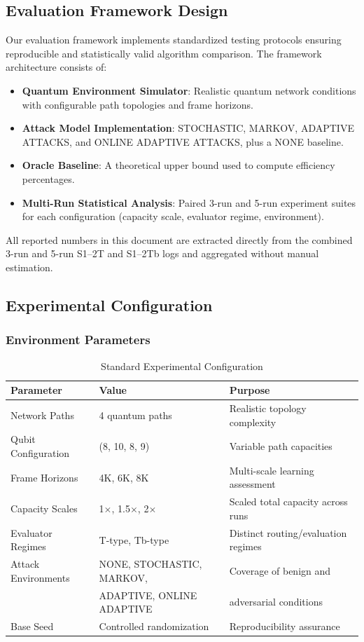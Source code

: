 \documentclass[12pt,a4paper]{article}
\begin{document}
\subsection{Evaluation Framework Design}

Our evaluation framework implements standardized testing protocols ensuring reproducible and statistically valid algorithm comparison. The framework architecture consists of:

\begin{itemize}
\item \textbf{Quantum Environment Simulator}: Realistic quantum network conditions with configurable path topologies and frame horizons.
\item \textbf{Attack Model Implementation}: STOCHASTIC, MARKOV, ADAPTIVE ATTACKS, and ONLINE ADAPTIVE ATTACKS, plus a NONE baseline.
\item \textbf{Oracle Baseline}: A theoretical upper bound used to compute efficiency percentages.
\item \textbf{Multi-Run Statistical Analysis}: Paired 3-run and 5-run experiment suites for each configuration (capacity scale, evaluator regime, environment).
\end{itemize}

All reported numbers in this document are extracted directly from the combined 3-run and 5-run S1–2T and S1–2Tb logs and aggregated without manual estimation.

\subsection{Experimental Configuration}

\subsubsection{Environment Parameters}

\begin{table}[H]
\centering
\caption{Standard Experimental Configuration}
\begin{tabular}{|l|l|l|}
\hline
\textbf{Parameter} & \textbf{Value} & \textbf{Purpose} \\
\hline
\hline
Network Paths & 4 quantum paths & Realistic topology complexity \\
Qubit Configuration & (8, 10, 8, 9) & Variable path capacities \\
Frame Horizons & 4K, 6K, 8K & Multi-scale learning assessment \\
Capacity Scales & 1$\times$, 1.5$\times$, 2$\times$ & Scaled total capacity across runs \\
Evaluator Regimes & T-type, Tb-type & Distinct routing/evaluation regimes \\
Attack Environments & NONE, STOCHASTIC, MARKOV, & Coverage of benign and \\
 & ADAPTIVE, ONLINE ADAPTIVE & adversarial conditions \\
Base Seed & Controlled randomization & Reproducibility assurance \\
\hline
\end{tabular}
\end{table}
\end{document}
